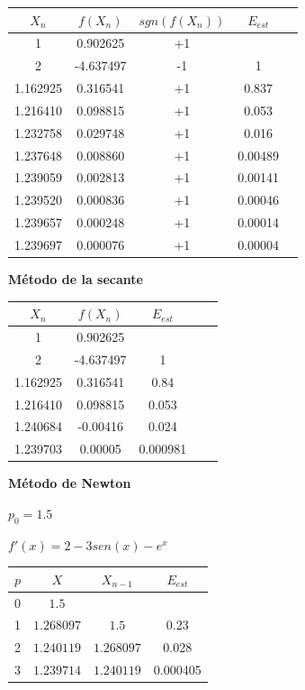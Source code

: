 \documentclass[12pt]{article}
\begin{document}
\begin{center}
    \begin{tabular}{|c|c|c|c|c|}
        \hline
        $X_n$&$f(X_n)$&$sgn(f(X_n))$&$E_{est}$\\
        \hline
        1        &0.902625& +1& \\
        2        &-4.637497&-1&1\\
        1.162925 &0.316541&+1&0.837\\
        1.216410 &0.098815&+1&0.053\\
        1.232758 &0.029748&+1&0.016\\
        1.237648 &0.008860&+1&0.00489\\
        1.239059 &0.002813&+1&0.00141\\
        1.239520 &0.000836&+1&0.00046\\
        1.239657 &0.000248&+1&0.00014\\
        1.239697 &0.000076&+1&0.00004\\
        \hline
      \end{tabular} 
\end{center}

\textbf{Método de la secante}
\normalsize

\begin{center}
    \begin{tabular}{|c|c|c|c|c|}
        \hline
        $X_n$&$f(X_n)$&$E_{est}$\\
        \hline
        1        &0.902625& \\
        2        &-4.637497&1\\
        1.162925 &0.316541&0.84\\
        1.216410 &0.098815&0.053\\
        1.240684 &-0.00416&0.024\\
        1.239703 &0.00005&0.000981\\
        \hline
      \end{tabular} 
\end{center}

\textbf{Método de Newton}
\normalsize

$p_0 = 1.5$

$f'(x) = 2 - 3sen(x) - e^x$

\begin{center}
    \begin{tabular}{|c|c|c|c|}
        \hline
        $p$&$X$&$X_{n-1}$&$E_{est}$\\
        \hline
        0 & $1.5$&  & \\
        1 &$1.268097$&$1.5$&0.23\\
        2 &$1.240119$&$1.268097$&0.028\\
        3 &$1.239714$&$1.240119$&0.000405\\
        \hline
      \end{tabular} 
\end{center}
\end{document}
